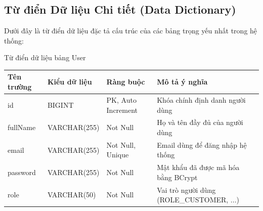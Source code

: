 \documentclass{uetgraduation}
\begin{document}
\subsection{Từ điển Dữ liệu Chi tiết (Data Dictionary)}
Dưới đây là từ điển dữ liệu đặc tả cấu trúc của các bảng trọng yếu nhất trong hệ thống:

\begin{table}[!htbp]{Từ điển dữ liệu bảng User}
\centering
\small
\begin{tabularx}{\textwidth}{|>{\raggedright\arraybackslash}p{2.8cm}|>{\raggedright\arraybackslash}p{3.0cm}|>{\raggedright\arraybackslash}p{3.5cm}|>{\raggedright\arraybackslash}X|}
\hline
\textbf{Tên trường} & \textbf{Kiểu dữ liệu} & \textbf{Ràng buộc} & \textbf{Mô tả ý nghĩa} \\ \hline
id & BIGINT & PK, Auto Increment & Khóa chính định danh người dùng \\ \hline
fullName & VARCHAR(255) & Not Null & Họ và tên đầy đủ của người dùng \\ \hline
email & VARCHAR(255) & Not Null, Unique & Email dùng để đăng nhập hệ thống \\ \hline
password & VARCHAR(255) & Not Null & Mật khẩu đã được mã hóa bằng BCrypt \\ \hline
role & VARCHAR(50) & Not Null & Vai trò người dùng (ROLE\_CUSTOMER, ...) \\ \hline
\end{tabularx}
\end{table}
\end{document}
